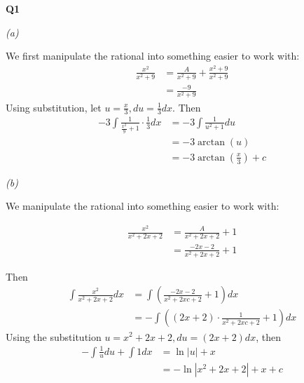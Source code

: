 \documentclass[12pt, a4paper]{article}
\begin{document}
\textbf{Q1}

\textit{(a)}

We first manipulate the rational into something easier to work with:
\begin{align*}
    \frac{x^2}{x^2 + 9} & = \frac{A}{x^2 + 9} + \frac{x^2 + 9}{x^2 + 9}\\
    & = \frac{-9}{x^2 + 9}
\end{align*}
Using substitution, let $u = \frac{x}{3}, du = \frac{1}{3}dx$. Then
\begin{align*}
    -3 \int \frac{1}{\frac{x^2}{9} + 1} \cdot \frac{1}{3} dx
    & = -3 \int \frac{1}{u^2 + 1} du\\
    & = -3 \arctan(u) \\ & = -3 \arctan(\frac{x}{3}) + c
\end{align*}

\textit{(b)}

We manipulate the rational into something easier to work with:

\begin{align*}
    \frac{x^2}{x^2+2x+2} & = \frac{A}{x^2 + 2x + 2} + 1\\
    & = \frac{-2x - 2}{x^2 + 2x + 2} + 1
\end{align*}

Then 
\begin{align*}
    \int \frac{x^2}{x^2 + 2x + 2}dx
    & = \int \left(\frac{-2x - 2}{x^2 + 2xc + 2} + 1\right)dx\\
    & = -\int \left((2x + 2)\cdot\frac{1}{x^2 + 2xc + 2} + 1\right)dx
\end{align*}
Using the substitution $u = x^2 + 2x +2, du = (2x + 2) dx$, then
\begin{align*}
    - \int \frac{1}{u} du + \int 1 dx & = \ln |u| + x\\
    & = -\ln |x^2 + 2x + 2| + x + c
\end{align*}
\end{document}
